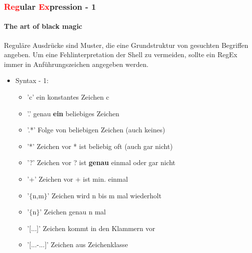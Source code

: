 \documentclass[12pt,utf8, handout]{beamer}
\begin{document}
\begin{frame}
\frametitle{\textcolor{red}{Reg}ular \textcolor{red}{Ex}pression - 1}
\framesubtitle{The art of black magic}
Reguläre Ausdrücke sind Muster, die eine Grundstruktur von gesuchten Begriffen angeben. Um eine Fehlinterpretation der Shell zu vermeiden, sollte ein RegEx immer in Anführungszeichen angegeben werden.
\begin{itemize}
	\item Syntax - 1:
	\begin{itemize}[<+->]
		\item 'c' ein konstantes Zeichen c
		\item '.' genau \textbf{ein} beliebiges Zeichen
		\item '.*' Folge von beliebigen Zeichen (auch keines)
		\item '*' Zeichen vor * ist beliebig oft (auch gar nicht)
		\item '?' Zeichen vor ? ist \textbf{genau} einmal oder gar nicht
		\item '+' Zeichen vor + ist min. einmal
		\item '$\{$n,m$\}$' Zeichen wird n bis m mal wiederholt
		\item '$\{$n$\}$' Zeichen genau n mal
		\item '[...]' Zeichen kommt in den Klammern vor
		\item '[...-...]' Zeichen aus Zeichenklasse
		
	\end{itemize}
\end{itemize}
\end{frame}
\end{document}
